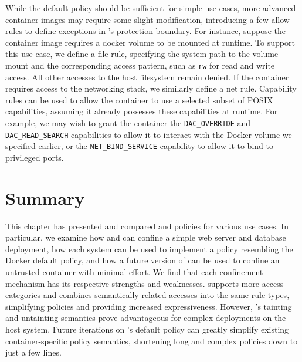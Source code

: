 While the \bpfcontain{} default policy should be sufficient for simple use cases, more
advanced container images may require some slight modification, introducing a few allow
rules to define exceptions in \bpfcontain{}'s protection boundary. For instance, suppose
the container image requires a docker volume to be mounted at runtime. To support this use
case, we define a file rule, specifying the system path to the volume mount and the
corresponding access pattern, such as \texttt{rw} for read and write access. All other
accesses to the host filesystem remain denied. If the container requires access to the
networking stack, we similarly define a net rule.  Capability rules can be used to allow
the container to use a selected subset of POSIX capabilities, assuming it already
possesses these capabilities at runtime. For example, we may wish to grant the container
the \texttt{DAC\_OVERRIDE} and \texttt{DAC\_READ\_SEARCH} capabilities to allow it to
interact with the Docker volume we specified earlier, or the \texttt{NET\_BIND\_SERVICE}
capability to allow it to bind to privileged ports.



\section{Summary}

This chapter has presented and compared \bpfbox{} and \bpfcontain{} policies for various
use cases. In particular, we examine how \bpfbox{} and \bpfcontain{} can confine a simple
web server and database deployment,  how each system can be used to implement a policy
resembling the Docker default policy, and how a future version of \bpfcontain{} can be
used to confine an untrusted container with minimal effort. We find that each confinement
mechanism has its respective strengths and weaknesses.  \bpfcontain{} supports more access
categories and combines semantically related accesses into the same rule types,
simplifying policies and providing increased expressiveness. However, \bpfbox{}'s tainting
and untainting semantics prove advantageous for complex deployments on the host system.
Future iterations on \bpfcontain{}'s default policy can greatly simplify existing
container-specific policy semantics, shortening long and complex policies down to just
a few lines.
